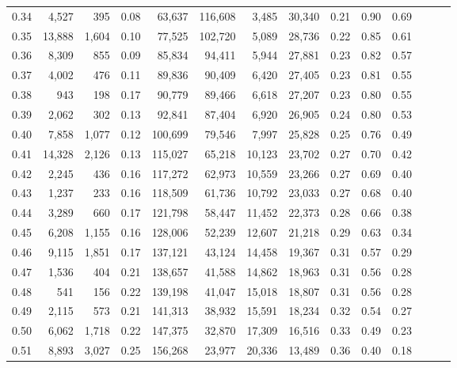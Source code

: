 \begin{tabular}{rrrrrrrrrrrrrr}
0.34 &   4,527 &    395 &  0.08 &   63,637 &  116,608 &   3,485 &  30,340 &  0.21 &  0.90 &      0.69 \\
0.35 &  13,888 &  1,604 &  0.10 &   77,525 &  102,720 &   5,089 &  28,736 &  0.22 &  0.85 &      0.61 \\
0.36 &   8,309 &    855 &  0.09 &   85,834 &   94,411 &   5,944 &  27,881 &  0.23 &  0.82 &      0.57 \\
0.37 &   4,002 &    476 &  0.11 &   89,836 &   90,409 &   6,420 &  27,405 &  0.23 &  0.81 &      0.55 \\
0.38 &     943 &    198 &  0.17 &   90,779 &   89,466 &   6,618 &  27,207 &  0.23 &  0.80 &      0.55 \\
0.39 &   2,062 &    302 &  0.13 &   92,841 &   87,404 &   6,920 &  26,905 &  0.24 &  0.80 &      0.53 \\
0.40 &   7,858 &  1,077 &  0.12 &  100,699 &   79,546 &   7,997 &  25,828 &  0.25 &  0.76 &      0.49 \\
0.41 &  14,328 &  2,126 &  0.13 &  115,027 &   65,218 &  10,123 &  23,702 &  0.27 &  0.70 &      0.42 \\
0.42 &   2,245 &    436 &  0.16 &  117,272 &   62,973 &  10,559 &  23,266 &  0.27 &  0.69 &      0.40 \\
0.43 &   1,237 &    233 &  0.16 &  118,509 &   61,736 &  10,792 &  23,033 &  0.27 &  0.68 &      0.40 \\
0.44 &   3,289 &    660 &  0.17 &  121,798 &   58,447 &  11,452 &  22,373 &  0.28 &  0.66 &      0.38 \\
0.45 &   6,208 &  1,155 &  0.16 &  128,006 &   52,239 &  12,607 &  21,218 &  0.29 &  0.63 &      0.34 \\
0.46 &   9,115 &  1,851 &  0.17 &  137,121 &   43,124 &  14,458 &  19,367 &  0.31 &  0.57 &      0.29 \\
0.47 &   1,536 &    404 &  0.21 &  138,657 &   41,588 &  14,862 &  18,963 &  0.31 &  0.56 &      0.28 \\
0.48 &     541 &    156 &  0.22 &  139,198 &   41,047 &  15,018 &  18,807 &  0.31 &  0.56 &      0.28 \\
0.49 &   2,115 &    573 &  0.21 &  141,313 &   38,932 &  15,591 &  18,234 &  0.32 &  0.54 &      0.27 \\
0.50 &   6,062 &  1,718 &  0.22 &  147,375 &   32,870 &  17,309 &  16,516 &  0.33 &  0.49 &      0.23 \\
0.51 &   8,893 &  3,027 &  0.25 &  156,268 &   23,977 &  20,336 &  13,489 &  0.36 &  0.40 &      0.18 \\

\end{tabular}
